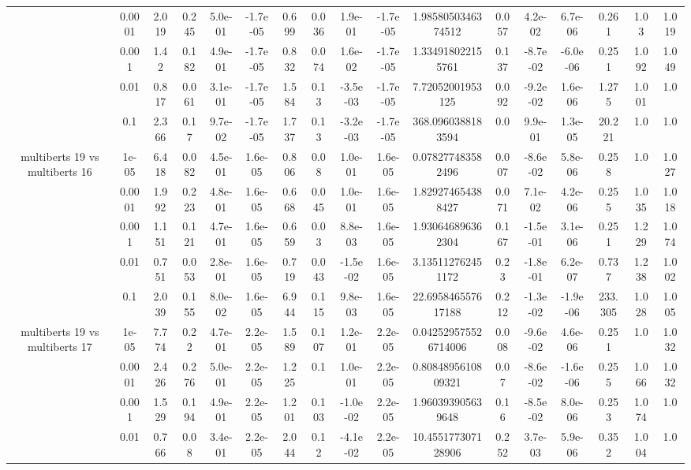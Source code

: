\begin{tabular}{|c|c|c|c|c|c|c|c|c|c|c|c|c|c|c|c|c|}
 & 0.0001 & 2.019 & 0.245 & 5.0e-01 & -1.7e-05 & 0.699 & 0.036 & 1.9e-01 & -1.7e-05 & 1.9858050346374512 & 0.057 & 4.2e-02 & 6.7e-06 & 0.261 & 1.03 & 1.019 \\
 & 0.001 & 1.42 & 0.182 & 4.9e-01 & -1.7e-05 & 0.832 & 0.074 & 1.6e-02 & -1.7e-05 & 1.334918022155761 & 0.137 & -8.7e-02 & -6.0e-06 & 0.251 & 1.092 & 1.049 \\
 & 0.01 & 0.817 & 0.061 & 3.1e-01 & -1.7e-05 & 1.584 & 0.13 & -3.5e-03 & -1.7e-05 & 7.72052001953125 & 0.092 & -9.2e-02 & 1.6e-06 & 1.275 & 1.001 & 1.0 \\
 & 0.1 & 2.366 & 0.17 & 9.7e-02 & -1.7e-05 & 1.737 & 0.13 & -3.2e-03 & -1.7e-05 & 368.0960388183594 & 0.0 & 9.9e-01 & 1.3e-05 & 20.221 & 1.0 & 1.0 \\
\hline
\multirow{5}{*}{multiberts 19 vs multiberts 16} & 1e-05 & 6.418 & 0.082 & 4.5e-01 & 1.6e-05 & 0.806 & 0.08 & 1.0e-01 & 1.6e-05 & 0.078277483582496 & 0.007 & -8.6e-02 & 5.8e-06 & 0.258 & 1.0 & 1.027 \\
 & 0.0001 & 1.992 & 0.223 & 4.8e-01 & 1.6e-05 & 0.668 & 0.045 & 1.0e-01 & 1.6e-05 & 1.829274654388427 & 0.071 & 7.1e-02 & 4.2e-06 & 0.255 & 1.035 & 1.018 \\
 & 0.001 & 1.151 & 0.121 & 4.7e-01 & 1.6e-05 & 0.659 & 0.03 & 8.8e-03 & 1.6e-05 & 1.930646896362304 & 0.167 & -1.5e-01 & 3.1e-06 & 0.251 & 1.229 & 1.074 \\
 & 0.01 & 0.751 & 0.053 & 2.8e-01 & 1.6e-05 & 0.719 & 0.043 & -1.5e-02 & 1.6e-05 & 3.135112762451172 & 0.23 & -1.8e-01 & 6.2e-07 & 0.737 & 1.238 & 1.002 \\
 & 0.1 & 2.039 & 0.155 & 8.0e-02 & 1.6e-05 & 6.944 & 0.115 & 9.8e-03 & 1.6e-05 & 22.695846557617188 & 0.212 & -1.3e-02 & -1.9e-06 & 233.305 & 1.028 & 1.005 \\
\hline
\multirow{5}{*}{multiberts 19 vs multiberts 17} & 1e-05 & 7.774 & 0.22 & 4.7e-01 & 2.2e-05 & 1.589 & 0.107 & 1.2e-01 & 2.2e-05 & 0.042529575526714006 & 0.008 & -9.6e-02 & 4.6e-06 & 0.251 & 1.0 & 1.032 \\
 & 0.0001 & 2.426 & 0.276 & 5.0e-01 & 2.2e-05 & 1.225 & 0.1 & 1.0e-01 & 2.2e-05 & 0.8084895610809321 & 0.07 & -8.6e-02 & -1.6e-06 & 0.255 & 1.066 & 1.032 \\
 & 0.001 & 1.529 & 0.194 & 4.9e-01 & 2.2e-05 & 1.201 & 0.103 & -1.0e-02 & 2.2e-05 & 1.960393905639648 & 0.16 & -8.5e-02 & 8.0e-06 & 0.253 & 1.074 & 1.0 \\
 & 0.01 & 0.766 & 0.08 & 3.4e-01 & 2.2e-05 & 2.044 & 0.12 & -4.1e-02 & 2.2e-05 & 10.455177307128906 & 0.252 & 3.7e-03 & 5.9e-06 & 0.352 & 1.004 & 1.0 \\

\end{tabular}
